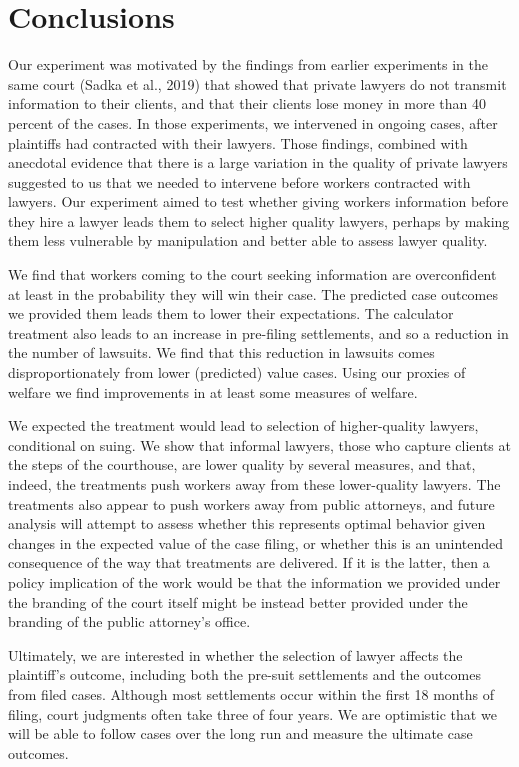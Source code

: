 \documentclass[oneside,12pt]{article}
\begin{document}
\section{Conclusions}
Our experiment was motivated by the findings from earlier experiments in the same court (Sadka et al., 2019) that showed that private lawyers do not transmit information to their clients, and that their clients lose money in more than 40 percent of the cases. In those experiments, we intervened in ongoing cases, after plaintiffs had contracted with their lawyers. Those findings, combined with anecdotal evidence that there is a large variation in the quality of private lawyers suggested to us that we needed to intervene before workers contracted with lawyers. Our experiment aimed to test whether giving workers information before they hire a lawyer leads them to select higher quality lawyers, perhaps by making them less vulnerable by manipulation and better able to assess lawyer quality.

We find that workers coming to the court seeking information are overconfident at least in the probability they will win their case. The predicted case outcomes we provided them leads them to lower their expectations. The calculator treatment also leads to an increase in pre-filing settlements, and so a reduction in the number of lawsuits. We find that this reduction in lawsuits comes disproportionately from lower (predicted) value cases. Using our proxies of welfare we find improvements in at least some measures of welfare.

We expected the treatment would lead to selection of higher-quality lawyers, conditional on suing. We show that informal lawyers, those who capture clients at the steps of the courthouse, are lower quality by several measures, and that, indeed, the treatments push workers away from these lower-quality lawyers. The treatments also appear to push workers away from public attorneys, and future analysis will attempt to assess whether this represents optimal behavior given changes in the expected value of the case filing, or whether this is an unintended consequence of the way that treatments are delivered. If it is the latter, then a policy implication of the work would be that the information we provided under the branding of the court itself might be instead better provided under the branding of the public attorney’s office. 

Ultimately, we are interested in whether the selection of lawyer affects the plaintiff’s outcome, including both the pre-suit settlements and the outcomes from filed cases. Although most settlements occur within the first 18 months of filing, court judgments often take three of four years. We are optimistic that we will be able to follow cases over the long run and measure the ultimate case outcomes.
\end{document}
